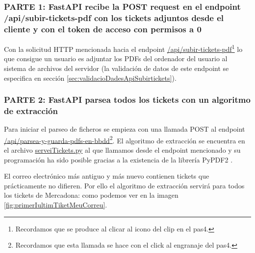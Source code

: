 \documentclass[a4paper,12pt]{report}
\begin{document}
		
		

		
		\subsubsection{PARTE 1: FastAPI recibe la POST request en el endpoint /api/subir-tickets-pdf con los tickets adjuntos desde el cliente y con el token de acceso con permisos a 0}
		\label{sec:PARTE1_FASTAPI}
		
		Con la solicitud HTTP mencionada hacia el endpoint \href{https://github.com/blackcub3s/mercApp/blob/1394c4a58c59d41e1b64f1113007277676fe4cf8/APP%20WEB/__FastAPI__/app/controlador.py#L111-L128}{/api/subir-tickets-pdf}\footnote{Recordamos que se produce al clicar al icono del clip en el pas4.} lo que consigue un usuario es adjuntar los PDFs del ordenador del usuario al sistema de archivos del servidor (la validación de datos de este endpoint se especifica en sección \ref{sec:validacioDadesApiSubirtickets}).
		
		\subsubsection{PARTE 2: FastAPI parsea todos los tickets con un algoritmo de extracción}
		\label{sec:PARTE2_FASTAPI}
		
		Para iniciar el parseo de ficheros se empieza con una llamada POST al endpoint \href{https://github.com/blackcub3s/mercApp/blob/f5413ed8cf7ed88c5ed18299564b836d27c52bd4/APP%20WEB/__FastAPI__/app/controlador.py#L132-L152}{/api/parsea-y-guarda-pdfs-en-bbdd}\footnote{Recordamos que esta llamada se hace con el click al engranaje del pas4.}. El algoritmo de extracción se encuentra en el archivo \href{https://github.com/blackcub3s/mercApp/blob/main/APP%20WEB/__FastAPI__/app/serveiTickets.py}{serveiTickets.py} al que llamamos desde el endpoint mencionado y su programación ha sido posible gracias a la existencia de la librería PyPDF2 \cite{PyPDF2}.
		
		El correo electrónico más antiguo y más nuevo contienen tickets que prácticamente no difieren. Por ello el algoritmo de extracción servirá para todos los tickets de Mercadona: como podemos ver en la imagen \ref{fig:primerIultimTiketMeuCorreu}.
		
		
		
\end{document}
